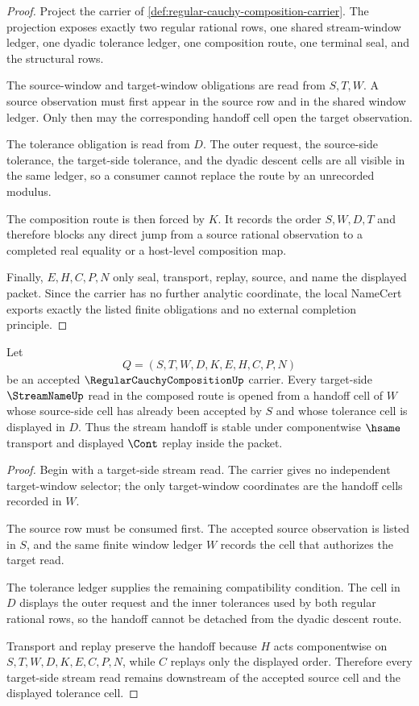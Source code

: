\begin{proof}
Project the carrier of \autoref{def:regular-cauchy-composition-carrier}. The projection exposes exactly two regular rational rows, one shared stream-window ledger, one dyadic tolerance ledger, one composition route, one terminal seal, and the structural rows.

The source-window and target-window obligations are read from $S,T,W$. A source observation must first appear in the source row and in the shared window ledger. Only then may the corresponding handoff cell open the target observation.

The tolerance obligation is read from $D$. The outer request, the source-side tolerance, the target-side tolerance, and the dyadic descent cells are all visible in the same ledger, so a consumer cannot replace the route by an unrecorded modulus.

The composition route is then forced by $K$. It records the order $S,W,D,T$ and therefore blocks any direct jump from a source rational observation to a completed real equality or a host-level composition map.

Finally, $E,H,C,P,N$ only seal, transport, replay, source, and name the displayed packet. Since the carrier has no further analytic coordinate, the local NameCert exports exactly the listed finite obligations and no external completion principle.
\end{proof}

\begin{theorem}\label{thm:regular-cauchy-composition-stream-handoff}
Let
$$
Q=(S,T,W,D,K,E,H,C,P,N)
$$
be an accepted $\RegularCauchyCompositionUp$ carrier. Every target-side $\StreamNameUp$ read in the composed route is opened from a handoff cell of $W$ whose source-side cell has already been accepted by $S$ and whose tolerance cell is displayed in $D$. Thus the stream handoff is stable under componentwise $\hsame$ transport and displayed $\Cont$ replay inside the packet.
\end{theorem}
\begin{proof}
Begin with a target-side stream read. The carrier gives no independent target-window selector; the only target-window coordinates are the handoff cells recorded in $W$.

The source row must be consumed first. The accepted source observation is listed in $S$, and the same finite window ledger $W$ records the cell that authorizes the target read.

The tolerance ledger supplies the remaining compatibility condition. The cell in $D$ displays the outer request and the inner tolerances used by both regular rational rows, so the handoff cannot be detached from the dyadic descent route.

Transport and replay preserve the handoff because $H$ acts componentwise on $S,T,W,D,K,E,C,P,N$, while $C$ replays only the displayed order. Therefore every target-side stream read remains downstream of the accepted source cell and the displayed tolerance cell.
\end{proof}

